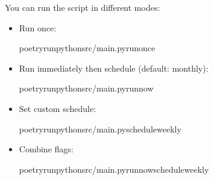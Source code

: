 \documentclass[letterpaper,10pt,english]{sphinxmanual}
\begin{document}
\sphinxAtStartPar
You can run the script in different modes:
\begin{itemize}
\item {} 
\sphinxAtStartPar
Run once:

\begin{sphinxVerbatim}[commandchars=\\\{\}]
poetryrunpythonsrc/main.py\PYGZhy{}\PYGZhy{}run\PYGZhy{}once
\end{sphinxVerbatim}

\item {} 
\sphinxAtStartPar
Run immediately then schedule (default: monthly):

\begin{sphinxVerbatim}[commandchars=\\\{\}]
poetryrunpythonsrc/main.py\PYGZhy{}\PYGZhy{}run\PYGZhy{}now
\end{sphinxVerbatim}

\item {} 
\sphinxAtStartPar
Set custom schedule:

\begin{sphinxVerbatim}[commandchars=\\\{\}]
poetryrunpythonsrc/main.py\PYGZhy{}\PYGZhy{}scheduleweekly
\end{sphinxVerbatim}

\item {} 
\sphinxAtStartPar
Combine flags:

\begin{sphinxVerbatim}[commandchars=\\\{\}]
poetryrunpythonsrc/main.py\PYGZhy{}\PYGZhy{}run\PYGZhy{}now\PYGZhy{}\PYGZhy{}scheduleweekly
\end{sphinxVerbatim}

\end{itemize}

\sphinxAtStartPar
{}
\end{document}
